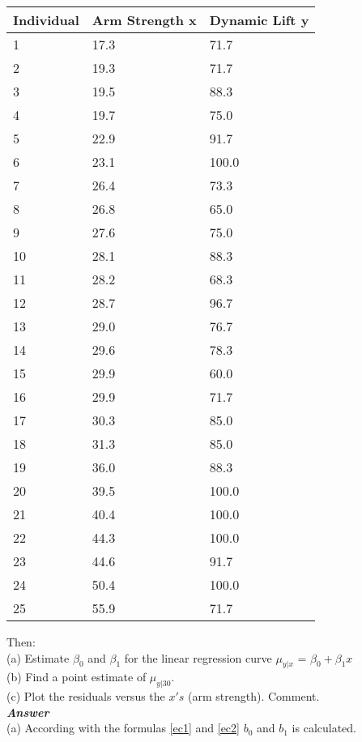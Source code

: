 \documentclass[10pt]{IEEEtran}
\begin{document}
\begin{table}[htbp]
\begin{center}
\begin{tabular}{|l|l|l|}
\hline
Individual & Arm Strength x & Dynamic Lift y\\
\hline \hline 
1 & 17.3 & 71.7 \\ \hline
2 & 19.3 & 71.7 \\ \hline
3 & 19.5 & 88.3\\ \hline
4 & 19.7 & 75.0\\ \hline
5 & 22.9 & 91.7\\ \hline
6 & 23.1 & 100.0\\ \hline
7 & 26.4 & 73.3\\ \hline
8 & 26.8 & 65.0\\ \hline
9 & 27.6 & 75.0\\ \hline
10& 28.1&88.3\\ \hline
11& 28.2&68.3\\ \hline
12&28.7& 96.7\\ \hline
13&29.0&76.7\\ \hline
14&29.6&78.3\\ \hline
15&29.9&60.0\\ \hline
16&29.9&71.7\\ \hline
17&30.3&85.0\\ \hline
18&31.3&85.0\\ \hline
19&36.0&88.3\\ \hline
20&39.5&100.0\\ \hline
21&40.4&100.0\\ \hline
22&44.3&100.0\\ \hline
23&44.6&91.7\\ \hline
24&50.4&100.0\\ \hline
25&55.9&71.7\\ \hline
\end{tabular}
\caption{}
\label{tabla:sencilla}
\end{center}
\end{table}

Then: \\
(a) Estimate $\beta_{0}$ and $\beta_{1}$ for the linear regression curve $\mu_{{y}|{x}}$ = $\beta_{0} + \beta_{1} x$\\
(b) Find a point estimate of $\mu_{{y}|{30}}$.\\
(c) Plot the residuals versus the $x's$ (arm strength). Comment.\\

\textit{\textbf{Answer}}\\
(a) According with the formulas \ref{ec1} and \ref{ec2} $b_{0}$ and $b_{1}$ is calculated.
\end{document}
